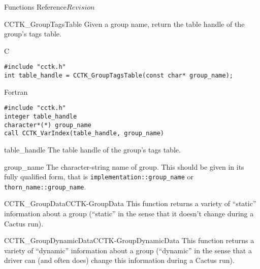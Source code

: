 \begin{cactuspart}{ Functions Reference}{}{$Revision$}
\begin{FunctionDescription}{CCTK\_GroupTagsTable}
\label{CCTK-GroupTagsTable}
Given a group name, return the table handle of the group's tags table.

\begin{SynopsisSection}
\begin{Synopsis}{C}
\begin{verbatim}
#include "cctk.h"
int table_handle = CCTK_GroupTagsTable(const char* group_name);
\end{verbatim}
\end{Synopsis}
\begin{Synopsis}{Fortran}
\begin{verbatim}
#include "cctk.h"
integer table_handle
character*(*) group_name
call CCTK_VarIndex(table_handle, group_name)
\end{verbatim}
\end{Synopsis}
\end{SynopsisSection}

\begin{ResultSection}
\begin{Result}{table\_handle}
The table handle of the group's tags table.
\end{Result}
\end{ResultSection}

\begin{ParameterSection}
\begin{Parameter}{group\_name}
The character-string name of group.  This should be given in its fully 
qualified form, that is \verb|implementation::group_name| or
\verb|thorn_name::group_name|.
\end{Parameter}
\end{ParameterSection}

\begin{SeeAlsoSection}
\begin{SeeAlso2}{CCTK\_GroupData}{CCTK-GroupData}
This function returns a variety of ``static'' information about a group
(``static'' in the sense that it doesn't change during a Cactus run).
\end{SeeAlso2}
\begin{SeeAlso2}{CCTK\_GroupDynamicData}{CCTK-GroupDynamicData}
This function returns a variety of ``dynamic'' information about a group
(``dynamic'' in the sense that a driver can (and often does) change this
information during a Cactus run).
\end{SeeAlso2}
\end{SeeAlsoSection}


\end{FunctionDescription}
\end{cactuspart}
